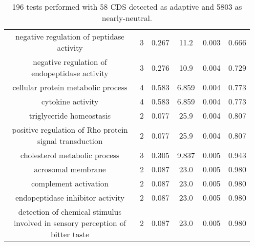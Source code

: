\documentclass[USLetter,5pt]{article}
\begin{document}
\begin{table}[ht]
\begin{adjustbox}{width = 1\textwidth}
\begin{tabular}{|c|c|c|c|c|c|}
negative regulation of peptidase activity & 3 &  0.267 &   11.2 &  0.003 &  0.666\\
negative regulation of endopeptidase activity & 3 &  0.276 &   10.9 &  0.004 &  0.729\\
cellular protein metabolic process & 4 &  0.583 &  6.859 &  0.004 &  0.773\\
cytokine activity & 4 &  0.583 &  6.859 &  0.004 &  0.773\\
triglyceride homeostasis & 2 &  0.077 &   25.9 &  0.004 &  0.807\\
positive regulation of Rho protein signal transduction & 2 &  0.077 &   25.9 &  0.004 &  0.807\\
cholesterol metabolic process & 3 &  0.305 &  9.837 &  0.005 &  0.943\\
acrosomal membrane & 2 &  0.087 &   23.0 &  0.005 &  0.980\\
complement activation & 2 &  0.087 &   23.0 &  0.005 &  0.980\\
endopeptidase inhibitor activity & 2 &  0.087 &   23.0 &  0.005 &  0.980\\
detection of chemical stimulus involved in sensory perception of bitter taste & 2 &  0.087 &   23.0 &  0.005 &  0.980\\
\hline
\end{tabular}
\end{adjustbox}
\caption{196 tests performed with 58 CDS detected as adaptive and 5803 as nearly-neutral.
}
\end{table}
\end{document}

